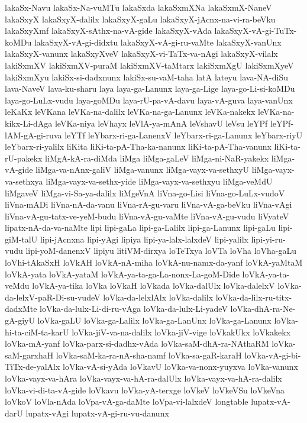 {lakaSx-Navu
lakaSx-Na-vuMTu
lakaSxda
lakaSxmXNa
lakaSxmX-NaneV
lakaSxyX
lakaSxyX-dalilx
lakaSxyX-gaLu
lakaSxyX-jAcnx-na-vi-ra-beVku
lakaSxyXmf
lakaSxyX-sAthx-na-vA-gide
lakaSxyX-vAda
lakaSxyX-vA-gi-TuTx-koMDu
lakaSxyX-vA-gi-didxtu
lakaSxyX-vA-gi-ru-vaMte
lakaSxyX-vanUnx
lakaSxyX-vanunx
lakaSxyXveV
lakaSxyX-vi-TaTx-va-nAgi
lakaSxyX-vilalx
lakiSxmXV
lakiSxmXV-puraM
lakiSxmXV-taMtarx
lakiSxmXgU
lakiSxmXyeV
lakiSxmXyu
lakiSx-si-dadxnunx
lakiSx-su-vaM-taha
latA
lateyu
lava-NA-diSu
lava-NaveV
lava-ku-sharu
laya
laya-ga-Lanunx
laya-ga-Lige
laya-go-Li-si-koMDu
laya-go-LuLx-vudu
laya-goMDu
laya-rU-pa-vA-davu
laya-vA-guva
laya-vanUnx
leKaKx
leVKana
leVKa-na-dalilx
leVKa-na-ga-Lanunx
leVKa-nakekx
leVKa-na-kikx-Li-dAga
leVKa-niya
leVhayx
leVlA-ya-mAnA
leVshavU
leVsu
leYPf
leYPf-lAM-gA-gi-ruva
leYTf
leYbarx-ri-ga-LanenxV
leYbarx-ri-ga-Lanunx
leYbarx-riyU
leYbarx-ri-yalilx
liKita
liKi-ta-pA-Tha-ka-nanunx
liKi-ta-pA-Tha-vanunx
liKi-ta-rU-pakekx
liMgA-kA-ra-diMda
liMga
liMga-gaLeV
liMga-ni-NaR-yakekx
liMga-vA-gide
liMga-va-nAnx-galiV
liMga-vanunx
liMga-vayx-va-sethxyU
liMga-vayx-va-sethxya
liMga-vayx-va-sethx-yide
liMga-vayx-va-sethxyu
liMga-veMdU
liMgaveV
liMga-vi-Sa-ya-dalilx
liMgeVnA
liVna-go-Lisi
liVna-go-LuLx-vudoV
liVna-mADi
liVna-nA-da-vanu
liVna-rA-gu-varu
liVna-vA-ga-beVku
liVna-vAgi
liVna-vA-gu-tatx-ve-yeM-budu
liVna-vA-gu-vaMte
liVna-vA-gu-vudu
liVyateV
lipatx-nA-da-va-naMte
lipi
lipi-gaLa
lipi-ga-Lalilx
lipi-ga-Lanunx
lipi-gaLu
lipi-giM-talU
lipi-jAcnxna
lipi-yAgi
lipiya
lipi-ya-lalx-lalxdeV
lipi-yalilx
lipi-yi-ru-vudu
lipi-yoM-danenxV
lipiyu
litiVM-dirxya
loTeTxya
loVTa
loVha
loVha-gaLu
loVhi-tAkaSxH
loVkAH
loVkA-nA-miha
loVkA-nu-namx-da-yanf
loVkA-yaMtaM
loVkA-yata
loVkA-yataM
loVkA-ya-ta-ga-La-nonx-La-goM-Dide
loVkA-ya-ta-veMdu
loVkA-ya-tika
loVka
loVkaH
loVkada
loVka-dalUlx
loVka-dalelxV
loVka-da-lelxV-paR-Di-su-vudeV
loVka-da-lelxlAlx
loVka-dalilx
loVka-da-lilx-ru-titx-dadxMte
loVka-da-lulx-Li-di-ru-vAga
loVka-da-lulx-Li-yadeV
loVka-dhA-ra-Ne-gA-giyU
loVka-gaLU
loVka-ga-Lalilx
loVka-ga-LanUnx
loVka-ga-Lanunx
loVka-hi-ta-ciM-ta-karU
loVka-jiV-va-na-dalilx
loVka-jiV-vige
loVkakUkx
loVkakekx
loVka-mA-yanf
loVka-parx-si-dadhx-vAda
loVka-saM-dhA-ra-NAthaRM
loVka-saM-garxhaH
loVka-saM-ka-ra-nA-sha-namf
loVka-sa-gaR-karaH
loVka-vA-gi-bi-TiTx-de-yalAlx
loVka-vA-si-yAda
loVkavU
loVka-va-nonx-yuyxva
loVka-vanunx
loVka-vayx-va-hAra
loVka-vayx-va-hA-ra-dalUlx
loVka-vayx-va-hA-ra-dalilx
loVka-vi-di-ta-vA-gide
loVkavu
loVka-yA-terxge
loVkeV
loVkeVSu
loVkeVna
loVkoV
loVla-nAda
loVpa-vA-ga-daMte
loVpa-vi-lalxdeV
longtable
lupatx-vA-darU
lupatx-vAgi
lupatx-vA-gi-ru-vu-danunx
}
